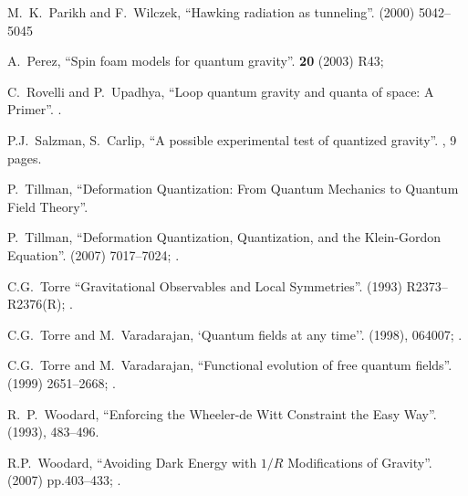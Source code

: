 \begin{thebibliography}{99}
M.~K.~Parikh and F.~Wilczek,
``Hawking radiation as tunneling''.
  (2000) 5042--5045
\newline
{\tt{}}

A.~Perez,
``Spin foam models for quantum gravity''.
 \textbf{20} (2003) R43;
\\
{\tt{}}

C.~Rovelli and P.~Upadhya,
``Loop quantum gravity and quanta of space: A Primer''.
.

 P.J.~Salzman, S.~Carlip,
``A possible experimental test of quantized gravity''. , 9 pages.

 P.~Tillman, ``Deformation Quantization: From Quantum Mechanics to
Quantum Field Theory''. 

 P.~Tillman, ``Deformation Quantization, Quantization, and the
Klein-Gordon Equation''.
  (2007) 7017--7024; .\\
{\tt{}}

C.G.~Torre
``Gravitational Observables and Local Symmetries''.
  (1993) R2373--R2376(R); .\newline
{\tt{}}

C.G.~Torre and M.~Varadarajan,
`Quantum fields at any time''.
  (1998), 064007; .\newline
{\tt{}}

C.G.~Torre and M.~Varadarajan,
``Functional evolution of free quantum fields''.
  (1999) 2651--2668; .\newline
{\tt{}}

R.~P.~Woodard,
``Enforcing the Wheeler-de Witt Constraint the Easy Way''.
  (1993), 483--496.\\
{\tt{}}

 R.P.~Woodard,
  ``Avoiding Dark Energy with $1/R$ Modifications of Gravity''.
    (2007) pp.403--433; .\\
{\tt{}}


\end{thebibliography}
